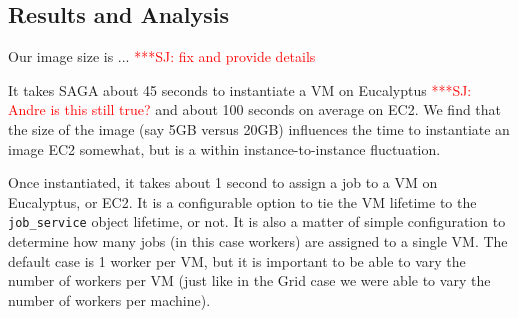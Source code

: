 \documentclass[conference,final]{IEEEtran}
\newcommand{\jhanote}[1]{ {\textcolor{red} { ***SJ: #1 }}}
\newcommand{\jhanote}[1]{}
\begin{document}
\subsection{Results and Analysis}

Our image size is ... \jhanote{fix and provide details}

It takes SAGA about 45 seconds to instantiate a VM on Eucalyptus
\jhanote{Andre is this still true?}  and about 100 seconds on average
on EC2.  We find that the size of the image (say 5GB versus 20GB)
influences the time to instantiate an image EC2 somewhat, but is a
within instance-to-instance fluctuation.

Once instantiated, it takes about 1 second to assign a job to a VM on
Eucalyptus, or EC2.  It is a configurable option to tie the VM
lifetime to the \texttt{job\_service} object lifetime, or not.  It is
also a matter of simple configuration to determine how many jobs (in
this case workers) are assigned to a single VM. The default case is 1
worker per VM, but it is important to be able to vary the number of
workers per VM (just like in the Grid case we were able to vary the
number of workers per machine). 
\end{document}

